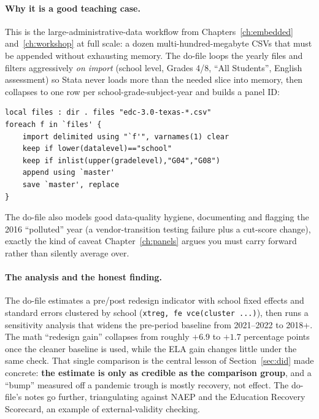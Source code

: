 \documentclass[
    a4paper,
    fontsize=10pt,
    twoside=true,
    numbers=noenddot,
]{kaobook}
\begin{document}
\paragraph{Why it is a good teaching case.} This is the large-administrative-data workflow from Chapters~\ref{ch:embedded} and~\ref{ch:workshop} at full scale: a dozen multi-hundred-megabyte CSVs that must be appended without exhausting memory. The do-file loops the yearly files and filters aggressively \emph{on import} (school level, Grades 4/8, \enquote{All Students}, English assessment) so Stata never loads more than the needed slice into memory, then collapses to one row per school-grade-subject-year and builds a panel ID:
\par
{\footnotesize
\begin{verbatim}
local files : dir . files "edc-3.0-texas-*.csv"
foreach f in `files' {
    import delimited using "`f'", varnames(1) clear
    keep if lower(datalevel)=="school"
    keep if inlist(upper(gradelevel),"G04","G08")
    append using `master'
    save `master', replace
}
\end{verbatim}
}
The do-file also models good data-quality hygiene, documenting and flagging the 2016 \enquote{polluted} year (a vendor-transition testing failure plus a cut-score change), exactly the kind of caveat Chapter~\ref{ch:panels} argues you must carry forward rather than silently average over.

\paragraph{The analysis and the honest finding.} The do-file estimates a pre/post redesign indicator with school fixed effects and standard errors clustered by school (\texttt{xtreg, fe vce(cluster ...)}), then runs a sensitivity analysis that widens the pre-period baseline from 2021--2022 to 2018+. The math \enquote{redesign gain} collapses from roughly $+6.9$ to $+1.7$ percentage points once the cleaner baseline is used, while the ELA gain changes little under the same check. That single comparison is the central lesson of Section~\ref{sec:did} made concrete: \textbf{the estimate is only as credible as the comparison group}, and a \enquote{bump} measured off a pandemic trough is mostly recovery, not effect. The do-file's notes go further, triangulating against NAEP and the Education Recovery Scorecard, an example of external-validity checking.
\end{document}
